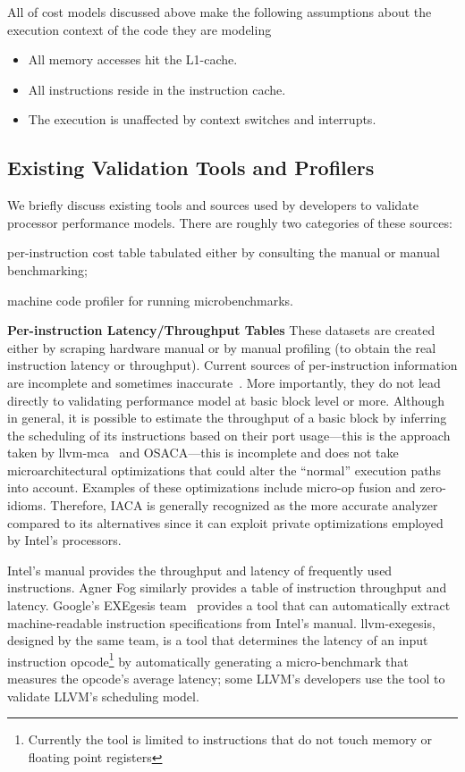 \vspace{1em}
All of cost models discussed above make the following assumptions about the execution context
of the code they are modeling
\begin{itemize}
    \item All memory accesses hit the L1-cache.
    \item All instructions reside in the instruction cache.
    \item The execution is unaffected by context switches and interrupts.
\end{itemize}

\subsection{Existing Validation Tools and Profilers}
We briefly discuss existing tools and sources used by developers to validate
processor performance  models.
There are roughly two categories of these sources:
\begin{enumerate*}
\item per-instruction cost table tabulated either by
consulting the manual or manual benchmarking;
\item machine code profiler for running microbenchmarks.
\end{enumerate*}

\textbf{Per-instruction Latency/Throughput Tables}
These datasets are created either by scraping hardware manual or
by manual profiling 
(to obtain the real instruction latency or throughput).
Current sources of per-instruction information are incomplete and sometimes inaccurate~\cite{uops}. 
More importantly, they do not lead directly to validating performance model at basic block level or more.
Although in general, it is possible to estimate the throughput of 
a basic block by inferring the scheduling of its instructions based on their
port usage---this is the approach taken by llvm-mca~\cite{llvm-mca} and OSACA\cite{osaca}---this
is incomplete and does not take microarchitectural
optimizations that could alter the ``normal'' execution paths into account. 
Examples of these optimizations include micro-op fusion and zero-idioms.
Therefore, IACA\cite{iaca} is generally recognized as the more accurate analyzer
compared to its alternatives since it can exploit
private optimizations employed by Intel's processors.

Intel's manual\cite{intel-manual} provides the throughput and latency
of frequently used instructions.
Agner Fog\cite{agner} similarly provides a table of instruction throughput and latency.
Google's EXEgesis team~\cite{exegesis} provides a tool that can automatically extract
machine-readable instruction specifications from Intel's manual.
llvm-exegesis, designed by the same team, is a tool that determines
the latency of an input instruction opcode\footnote{
Currently the tool is limited to instructions that do not touch memory or floating point registers} 
by automatically generating a micro-benchmark that measures the opcode's average latency;
some LLVM's developers use the tool to validate LLVM's scheduling model.

